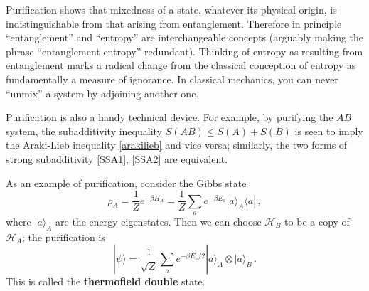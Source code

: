 \documentclass[11pt]{article}
\newcommand{\ket}[1]{|{#1}\rangle}
\newcommand{\bra}[1]{\langle{#1}|}
\newcommand{\HH}{\mathcal{H}}
\begin{document}
Purification shows that mixedness of a state, whatever its physical origin, is indistinguishable from that arising from entanglement. Therefore in principle ``entanglement'' and ``entropy'' are interchangeable concepts (arguably making the phrase ``entanglement entropy'' redundant). Thinking of entropy as resulting from entanglement marks a radical change from the classical conception of entropy as fundamentally a measure of ignorance. In classical mechanics, you can never ``unmix'' a system by adjoining another one.

Purification is also a handy technical device. For example, by purifying the $AB$ system, the subadditivity inequality $S(AB)\le S(A)+S(B)$ is seen to imply the Araki-Lieb inequality \eqref{arakilieb} and vice versa; similarly, the two forms of strong subadditivity \eqref{SSA1}, \eqref{SSA2} are equivalent.

As an example of purification, consider the Gibbs state
\begin{equation}\label{Gibbs}
\rho_A = \frac1Ze^{-\beta H_A} = \frac1Z\sum_ae^{-\beta E_a}\ket{a}_A\bra{a}\,,
\end{equation}
where $\ket{a}_A$ are the energy eigenstates. Then we can choose $\HH_B$ to be a copy of $\HH_A$; the purification is
\begin{equation}\label{TFD}
\ket{\psi} = \frac1{\sqrt Z}\sum_ae^{-\beta E_a/2}\ket{a}_A\otimes\ket{a}_B\,.
\end{equation}
This is called the \textbf{thermofield double} state.
\end{document}
